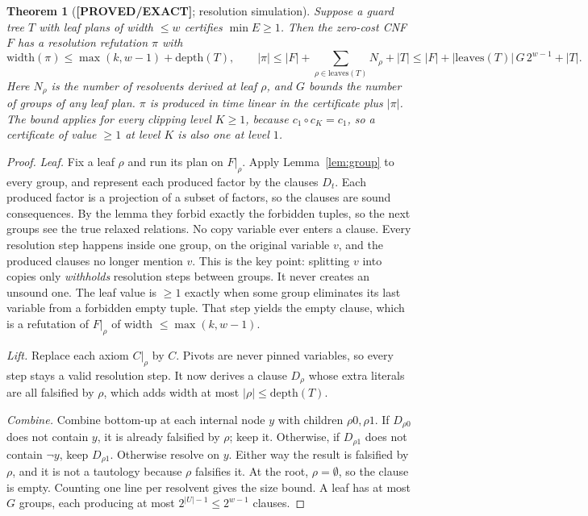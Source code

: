 \documentclass[11pt]{article}
\newtheorem{theorem}{Theorem}
\theoremstyle{definition}
\theoremstyle{remark}
\newcommand{\lab}[1]{\textbf{[#1]}}
\begin{document}
\begin{theorem}[\lab{PROVED/EXACT}; resolution simulation]\label{thm:sim}
Suppose a guard tree $T$ with leaf plans of width $\le w$ certifies $\min E\ge1$. Then the
zero-cost CNF $F$ has a resolution refutation $\pi$ with
\[\mathrm{width}(\pi)\le\max(k,w-1)+\mathrm{depth}(T),\qquad
|\pi|\le|F|+\sum_{\rho\in\mathrm{leaves}(T)}N_\rho+|T|\le|F|+|\mathrm{leaves}(T)|\,G\,2^{w-1}+|T|.\]
Here $N_\rho$ is the number of resolvents derived at leaf $\rho$, and $G$ bounds the number of
groups of any leaf plan. $\pi$ is produced in time linear in the certificate plus $|\pi|$.
The bound applies for every clipping level $K\ge1$, because $c_1\circ c_K=c_1$, so a
certificate of value $\ge1$ at level $K$ is also one at level $1$.
\end{theorem}
\begin{proof}
\emph{Leaf.} Fix a leaf $\rho$ and run its plan on $F|_\rho$. Apply Lemma~\ref{lem:group} to
every group, and represent each produced factor by the clauses $D_t$. Each produced factor is
a projection of a subset of factors, so the clauses are sound consequences. By the lemma they
forbid exactly the forbidden tuples, so the next groups see the true relaxed relations. No
copy variable ever enters a clause. Every resolution step happens inside one group, on the
original variable $v$, and the produced clauses no longer mention $v$. This is the key point:
splitting $v$ into copies only \emph{withholds} resolution steps between groups. It never
creates an unsound one. The leaf value is $\ge1$ exactly when some group eliminates its last
variable from a forbidden empty tuple. That step yields the empty clause, which is a
refutation of $F|_\rho$ of width $\le\max(k,w-1)$.

\emph{Lift.} Replace each axiom $C|_\rho$ by $C$. Pivots are never pinned variables, so every
step stays a valid resolution step. It now derives a clause $D_\rho$ whose extra literals are
all falsified by $\rho$, which adds width at most $|\rho|\le\mathrm{depth}(T)$.

\emph{Combine.} Combine bottom-up at each internal node $y$ with children $\rho0,\rho1$. If
$D_{\rho0}$ does not contain $y$, it is already falsified by $\rho$; keep it. Otherwise, if
$D_{\rho1}$ does not contain $\neg y$, keep $D_{\rho1}$. Otherwise resolve on $y$. Either way
the result is falsified by $\rho$, and it is not a tautology because $\rho$ falsifies it. At
the root, $\rho=\emptyset$, so the clause is empty. Counting one line per resolvent gives the
size bound. A leaf has at most $G$ groups, each producing at most $2^{|U|-1}\le2^{w-1}$
clauses.
\end{proof}
\end{document}
